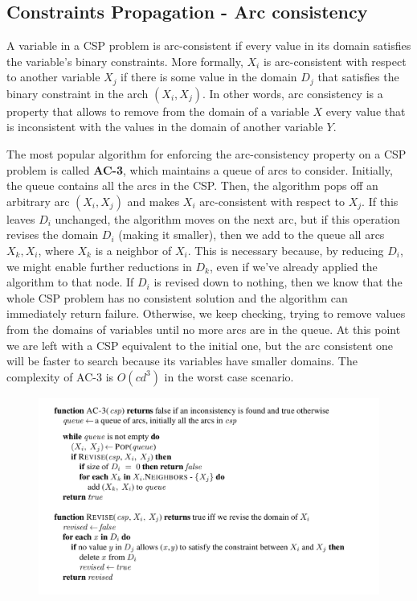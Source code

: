 \documentclass{article}
\begin{document}
\subsection{Constraints Propagation - Arc consistency}
A variable in a CSP problem is arc-consistent if every value in its domain satisfies the variable's binary constraints. More formally, $X_i$ is arc-consistent with respect to another variable $X_j$ if there is some value in the domain $D_j$ that satisfies the binary constraint in the arch $(X_i, X_j)$. In other words, arc consistency is a property that allows to remove from the domain of a variable $X$ every value that is inconsistent with the values in the domain of another variable $Y$. 

The most popular algorithm for enforcing the arc-consistency property on a CSP problem is called \textbf{AC-3}, which maintains a queue of arcs to consider. Initially, the queue contains all the arcs in the CSP. Then, the algorithm pops off an arbitrary arc $(X_i, X_j)$ and makes $X_i$ arc-consistent with respect to $X_j$. If this leaves $D_i$ unchanged, the algorithm moves on the next arc, but if this operation revises the domain $D_i$ (making it smaller), then we add to the queue all arcs $X_k, X_i$, where $X_k$ is a neighbor of $X_i$. This is necessary because, by reducing $D_i$, we might enable further reductions in $D_k$, even if we've already applied the algorithm to that node. If $D_i$ is revised down to nothing, then we know that the whole CSP problem has no consistent solution and the algorithm can immediately return failure. Otherwise, we keep checking, trying to remove values from the domains of variables until no more arcs are in the queue. At this point we are left with a CSP equivalent to the initial one, but the arc consistent one will be faster to search because its variables have smaller domains. The complexity of AC-3 is $O(cd^3)$ in the worst case scenario.

\begin{figure}[h]
    \centering
    \includegraphics[width=1\linewidth]{algorithms/AC-3.png}
    \label{fig:ac_3_algorithm}
\end{figure}
\end{document}
